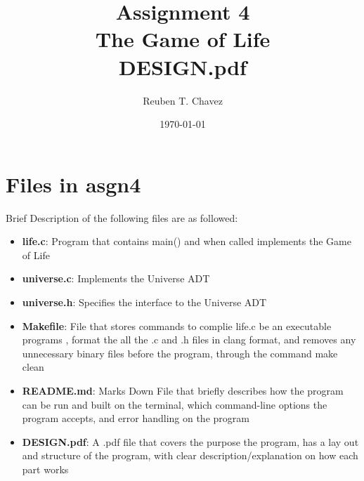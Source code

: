 \documentclass[11pt]{article} %
\title{Assignment 4 \\
    \large The Game of Life \\
    \textbf{ DESIGN.pdf}}
\author{Reuben T. Chavez}
\date{\today} %
\begin{document}
\maketitle %

\pagebreak
\section*{Files in asgn4} 

Brief Description of the following files are as followed:

\begin{itemize}
  \item \textbf{life.c}: Program that contains main() and when called implements the Game of Life 
  \item \textbf{universe.c}: Implements the Universe ADT
  \item \textbf{universe.h}: Specifies the interface to the Universe ADT
  \item \textbf{Makefile}: File that stores commands to complie life.c be an executable programs , format the all the .c and .h files in clang format, and removes any unnecessary binary files before the program, through the command make clean
  \item \textbf{README.md}: Marks Down File that briefly describes how the program can be run and built on the terminal, which command-line options the program accepts, and error handling on the program
  \item \textbf{DESIGN.pdf}: A .pdf file that covers the purpose the program, has a lay out and structure of the program, with clear description/explanation on how each part works
\end{itemize}

\pagebreak
\end{document}
